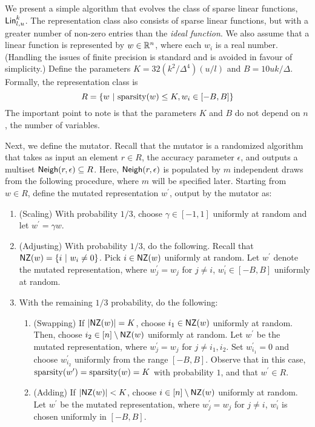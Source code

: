 We present a simple algorithm that evolves the class of sparse linear functions,
$\mathsf{Lin}^k_{l, u}$.  The representation class also consists of sparse linear
functions, but with a greater number of non-zero entries than the \emph{ideal
function}. We also assume that a linear function is represented by $w \in
\mathbb{R}^n$, where each $w_i$ is a real number. (Handling the issues of finite
precision is standard and is avoided in favour of simplicity.) Define the
parameters $K = 32(k^2/\Delta^4)(u/l)$ and $B = 10 uk /\Delta$. Formally, the
representation class is
\[ 
R = \{ w ~|~ \mathrm{sparsity}(w) \leq K, w_i \in [-B, B] \}
\]
The important point to note is that the parameters $K$ and $B$ do not depend on
$n$, the number of variables.

Next, we define the mutator. Recall that the mutator is a randomized algorithm
that takes as input an element $r \in R$, the accuracy parameter $\epsilon$,
and outputs a multiset $\mathsf{Neigh}(r, \epsilon) \subseteq R$. Here, $\mathsf{Neigh}(r,
\epsilon)$ is populated by $m$ independent draws from the following procedure,
where $m$ will be specified later. Starting from $w \in R$, define the mutated
representation $w^\prime$, output by the mutator as:
\begin{enumerate}
%
\item (Scaling) With probability $1/3$, choose $\gamma \in [-1, 1]$ uniformly at
random and let $w^\prime = \gamma w$. 
%
\item (Adjusting) With probability $1/3$, do the following. Recall that $\mathsf{NZ}(w)
= \{ i~|~ w_i \neq 0 \}$. Pick $i \in \mathsf{NZ}(w)$ uniformly at random. Let
$w^\prime$ denote the mutated representation, where $w^\prime_j = w_j$ for $j
\neq i$, $w^\prime_i \in [-B, B]$ uniformly at random. 
%
\item With the remaining $1/3$ probability, do the following:
\begin{enumerate}
\item (Swapping) If $|\mathsf{NZ}(w)| = K$, choose $i_1 \in \mathsf{NZ}(w)$ uniformly at random.
Then, choose $i_2 \in [n] \setminus \mathsf{NZ}(w)$ uniformly at random. Let $w^\prime$
be the mutated representation, where $w_j^\prime = w_j$ for $j \neq i_1, i_2$.
Set $w_{i_1}^\prime = 0$ and choose $w_{i_2}^\prime$ uniformly from the range
$[-B, B]$. Observe that in this case, $\mathrm{sparsity}(w^\prime) = \mathrm{sparsity}(w) = K$
with probability $1$, and that $w^\prime \in R$.
\item (Adding) If $|\mathsf{NZ}(w)| < K$, choose $i \in [n] \setminus \mathsf{NZ}(w)$ uniformly
at random. Let $w^\prime$ be the mutated representation, where $w_j^\prime =
w_j$ for $j \neq i$, $w^\prime_i$ is chosen uniformly in $[-B, B]$. 
\end{enumerate}
\end{enumerate}

